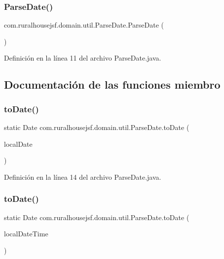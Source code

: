 \subsubsection{\texorpdfstring{ParseDate()}{ParseDate()}}
{\footnotesize\ttfamily com.\+ruralhousejsf.\+domain.\+util.\+Parse\+Date.\+Parse\+Date (\begin{DoxyParamCaption}{ }\end{DoxyParamCaption})\hspace{0.3cm}{\ttfamily [private]}}



Definición en la línea 11 del archivo Parse\+Date.\+java.



\subsection{Documentación de las funciones miembro}
\mbox{\label{a00196_a3a918df6cf2d9658332d7d5bee975d58}} 
\subsubsection{\texorpdfstring{toDate()}{toDate()}\hspace{0.1cm}{\footnotesize\ttfamily [1/2]}}
{\footnotesize\ttfamily static Date com.\+ruralhousejsf.\+domain.\+util.\+Parse\+Date.\+to\+Date (\begin{DoxyParamCaption}\item[{Local\+Date}]{local\+Date }\end{DoxyParamCaption})\hspace{0.3cm}{\ttfamily [static]}}



Definición en la línea 14 del archivo Parse\+Date.\+java.

\mbox{\label{a00196_ade5cf2cc6741490bf01834ac0ebf9dfe}} 
\subsubsection{\texorpdfstring{toDate()}{toDate()}\hspace{0.1cm}{\footnotesize\ttfamily [2/2]}}
{\footnotesize\ttfamily static Date com.\+ruralhousejsf.\+domain.\+util.\+Parse\+Date.\+to\+Date (\begin{DoxyParamCaption}\item[{Local\+Date\+Time}]{local\+Date\+Time }\end{DoxyParamCaption})\hspace{0.3cm}{\ttfamily [static]}}



